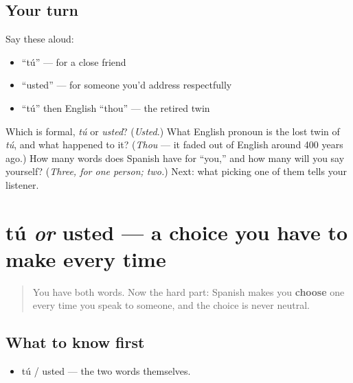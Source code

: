 \subsection*{Your turn}
Say these aloud:

\begin{itemize}
\raggedright
  \item \textquotedblleft{}tú\textquotedblright{} — for a close friend
  \item \textquotedblleft{}usted\textquotedblright{} — for someone you'd address respectfully
  \item \textquotedblleft{}tú\textquotedblright{} then English \textquotedblleft{}thou\textquotedblright{} — the retired twin
\end{itemize}

\begin{tcolorbox}[breakable,colback=teal!4,colframe=teal!35!black,title={Before you move on}]
Which is formal, \emph{tú} or \emph{usted}? (\emph{Usted}.) What English pronoun is the lost twin of \emph{tú}, and what happened to it? (\emph{Thou} — it faded out of English around 400 years ago.) How many words does Spanish have for \textquotedblleft{}you,\textquotedblright{} and how many will you say yourself? (\emph{Three, for one person; two.}) Next: what picking one of them tells your listener.
\end{tcolorbox}
\section[tú o usted]{tú \emph{or} usted — a choice you have to make every time}

\label{lesson:ES-C03-tu-usted-register}



\begin{quote}
You have both words. Now the hard part: Spanish makes you \textbf{choose} one every time you speak to someone, and the choice is never neutral.
\end{quote}

\subsection*{What to know first}
\begin{itemize}
\raggedright
  \item tú / usted — the two words themselves.
\end{itemize}

